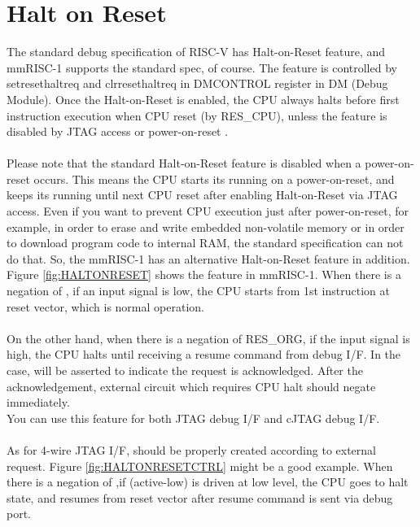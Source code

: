 \section{Halt on Reset}
\label{sec:HaltOnReset}

The standard debug specification of RISC-V has Halt-on-Reset feature, and mmRISC-1 supports the standard spec, of course. The feature is controlled by setresethaltreq and clrresethaltreq in DMCONTROL register in DM (Debug Module). Once the  Halt-on-Reset is enabled, the CPU always halts before first instruction execution when CPU reset (by RES\_CPU), unless the feature is disabled by JTAG access or power-on-reset .\\\\

Please note that the standard Halt-on-Reset feature is disabled when a power-on-reset  occurs. This means the CPU starts its running on a power-on-reset, and keeps its running until next CPU reset after enabling Halt-on-Reset via JTAG access. Even if you want to prevent CPU execution just after power-on-reset, for example, in order to erase and write embedded non-volatile memory or in order to download program code to internal RAM, the standard specification can not do that. So, the mmRISC-1 has an alternative Halt-on-Reset feature in addition.\\

Figure \ref{fig:HALTONRESET} shows the feature in mmRISC-1. When there is a negation of , if an input signal  is low, the CPU starts from 1st instruction at reset vector, which is normal operation. \\\\

On the other hand, when there is a negation of RES\_ORG, if the input signal  is high, the CPU halts until receiving a resume command from debug I/F. In the case,  will be asserted to indicate the request is acknowledged. After the acknowledgement, external circuit which requires CPU halt should negate  immediately.\\

You can use this feature for both JTAG debug I/F and cJTAG debug I/F. \\\\

As for 4-wire JTAG I/F,  should be properly created according to external request. Figure \ref{fig:HALTONRESETCTRL} might be a good example. When there is a negation of ,if (active-low) is driven at low level, the CPU goes to halt state, and resumes from reset vector after resume command is sent via debug port.\\\\

